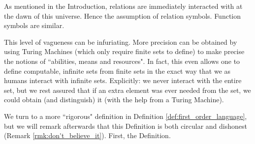 \documentclass[12pt]{article}
\theoremstyle{plain}
\theoremstyle{definition}
\begin{document}
	As mentioned in the Introduction, relations are immediately interacted with at the dawn of this universe. Hence the assumption of relation symbols. Function symbols are similar.
	
	This level of vagueness can be infuriating. More precision can be obtained by using Turing Machines (which only require finite sets to define) to make precise the notions of ``abilities, means and resources". In fact, this even allows one to define computable, infinite sets from finite sets in the exact way that we as humans interact with infinite sets. Explicitly: we never interact with the entire set, but we rest assured that if an extra element was ever needed from the set, we could obtain (and distinguish) it (with the help from a Turing Machine).
	
	We turn to a more ``rigorous" definition in Definition \ref{def:first_order_language}, but we will remark afterwards that this Definition is both circular and dishonest (Remark \ref{rmk:don't_believe_it}). First, the Definition.
	
\end{document}
